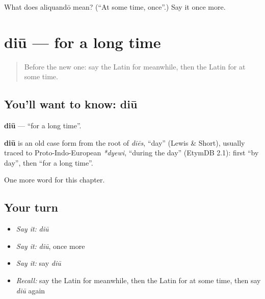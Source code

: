 \begin{tcolorbox}[breakable,colback=teal!4,colframe=teal!35!black,title={Before you move on}]
What does aliquandō mean? (\textquotedblleft{}At some time, once\textquotedblright{}.) Say it once more.
\end{tcolorbox}
\section[diū]{diū — for a long time}

\label{lesson:LA-C263-diu}



\begin{quote}
Before the new one: say the Latin for meanwhile, then the Latin for at some time.
\end{quote}

\subsection*{You'll want to know: diū}
\textbf{diū} — \textquotedblleft{}for a long time\textquotedblright{}.

\begin{cousinweb}
\textbf{diū} is an old case form from the root of \emph{diēs}, \textquotedblleft{}day\textquotedblright{} (Lewis \& Short), usually traced to Proto-Indo-European \emph{*dyewi}, \textquotedblleft{}during the day\textquotedblright{} (EtymDB 2.1): first \textquotedblleft{}by day\textquotedblright{}, then \textquotedblleft{}for a long time\textquotedblright{}.
\end{cousinweb}

\begin{grammarlens}[title={What you've built}]
One more word for this chapter.
\end{grammarlens}

\subsection*{Your turn}
\begin{itemize}
\raggedright
  \item \emph{Say it:} \emph{diū}
  \item \emph{Say it:} \emph{diū}, once more
  \item \emph{Say it:} say \emph{diū}
  \item \emph{Recall:} say the Latin for meanwhile, then the Latin for at some time, then say \emph{diū} again
\end{itemize}

